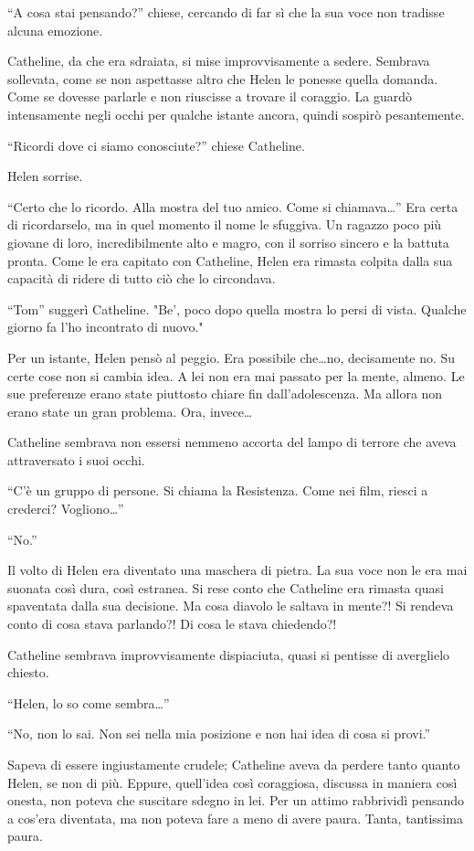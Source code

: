 \documentclass[a4paper,oneside,11pt]{memoir}
\begin{document}
``A cosa stai pensando?'' chiese, cercando di far sì che la sua voce non tradisse alcuna emozione.

Catheline, da che era sdraiata, si mise improvvisamente a sedere. Sembrava sollevata, come se non
aspettasse altro che Helen le ponesse quella domanda. Come se dovesse parlarle e non riuscisse a
trovare il coraggio. La guardò intensamente negli occhi per qualche istante ancora, quindi sospirò
pesantemente.

``Ricordi dove ci siamo conosciute?'' chiese Catheline.

Helen sorrise.

``Certo che lo ricordo. Alla mostra del tuo amico. Come si chiamava\dots'' Era certa di ricordarselo,
ma in quel momento il nome le sfuggiva. Un ragazzo poco più giovane di loro, incredibilmente alto e
magro, con il sorriso sincero e la battuta pronta. Come le era capitato con Catheline, Helen era
rimasta colpita dalla sua capacità di ridere di tutto ciò che lo circondava.

``Tom'' suggerì Catheline. "Be', poco dopo quella mostra lo persi di vista. Qualche giorno fa l'ho
incontrato di nuovo."

Per un istante, Helen pensò al peggio. Era possibile che\dots no, decisamente no. Su certe cose non si
cambia idea. A lei non era mai passato per la mente, almeno. Le sue preferenze erano state piuttosto
chiare fin dall'adolescenza. Ma allora non erano state un gran problema. Ora, invece\dots

Catheline sembrava non essersi nemmeno accorta del lampo di terrore che aveva attraversato i suoi
occhi.

``C'è un gruppo di persone. Si chiama la Resistenza. Come nei film, riesci a crederci?
Vogliono\dots''

``No.''

Il volto di Helen era diventato una maschera di pietra. La sua voce non le era mai suonata così
dura, così estranea. Si rese conto che Catheline era rimasta quasi spaventata dalla sua decisione.
Ma cosa diavolo le saltava in mente?! Si rendeva conto di cosa stava parlando?! Di cosa le stava
chiedendo?!

Catheline sembrava improvvisamente dispiaciuta, quasi si pentisse di averglielo chiesto.

``Helen, lo so come sembra\dots''

``No, non lo sai. Non sei nella mia posizione e non hai idea di cosa si provi.''

Sapeva di essere ingiustamente crudele; Catheline aveva da perdere tanto quanto Helen, se non di
più. Eppure, quell'idea così coraggiosa, discussa in maniera così onesta, non poteva che suscitare
sdegno in lei. Per un attimo rabbrividì pensando a cos'era diventata, ma non poteva fare a meno di
avere paura. Tanta, tantissima paura.
\end{document}
